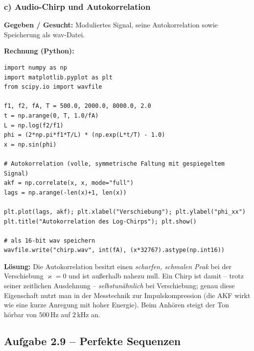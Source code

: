 \subsubsection*{c) Audio-Chirp und Autokorrelation}

\begin{beispiel}

\textbf{Gegeben / Gesucht:} Moduliertes Signal, seine Autokorrelation sowie
Speicherung als wav-Datei.

\textbf{Rechnung (Python):}
\begin{lstlisting}[style=python]
import numpy as np
import matplotlib.pyplot as plt
from scipy.io import wavfile

f1, f2, fA, T = 500.0, 2000.0, 8000.0, 2.0
t = np.arange(0, T, 1.0/fA)
L = np.log(f2/f1)
phi = (2*np.pi*f1*T/L) * (np.exp(L*t/T) - 1.0)
x = np.sin(phi)

# Autokorrelation (volle, symmetrische Faltung mit gespiegeltem Signal)
akf = np.correlate(x, x, mode="full")
lags = np.arange(-len(x)+1, len(x))

plt.plot(lags, akf); plt.xlabel("Verschiebung"); plt.ylabel("phi_xx")
plt.title("Autokorrelation des Log-Chirps"); plt.show()

# als 16-bit wav speichern
wavfile.write("chirp.wav", int(fA), (x*32767).astype(np.int16))
\end{lstlisting}

\textbf{Lösung:} Die Autokorrelation besitzt einen \emph{scharfen, schmalen Peak}
bei der Verschiebung $\varkappa=0$ und ist außerhalb nahezu null. Ein Chirp
ist damit -- trotz seiner zeitlichen Ausdehnung -- \emph{selbst\-un\-ähnlich} bei
Verschiebung; genau diese Eigenschaft nutzt man in der Messtechnik zur
Impulskompression (die AKF wirkt wie eine kurze Anregung mit hoher Energie). Beim
Anhören steigt der Ton hörbar von $500$\,Hz auf $2$\,kHz an.
\end{beispiel}

\subsection*{Aufgabe 2.9 – Perfekte Sequenzen}

